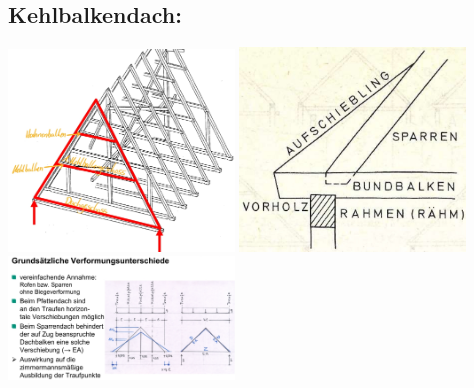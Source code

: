 \documentclass[fleqn,twoside]{article}
\begin{document}
    \subsection{Kehlbalkendach:}
            \includegraphics[width=0.45\textwidth]{Grafiken/Daecher/Sparrendach mit Kehlbalken.jpg}
            \includegraphics[width=0.45\textwidth]{Grafiken/Daecher/Sparrendach Fusspunktausbildung.jpg}\\
            \includegraphics[width=0.45\textwidth]{Grafiken/Daecher/Sparrendach Verformung.jpg}
\end{document}
